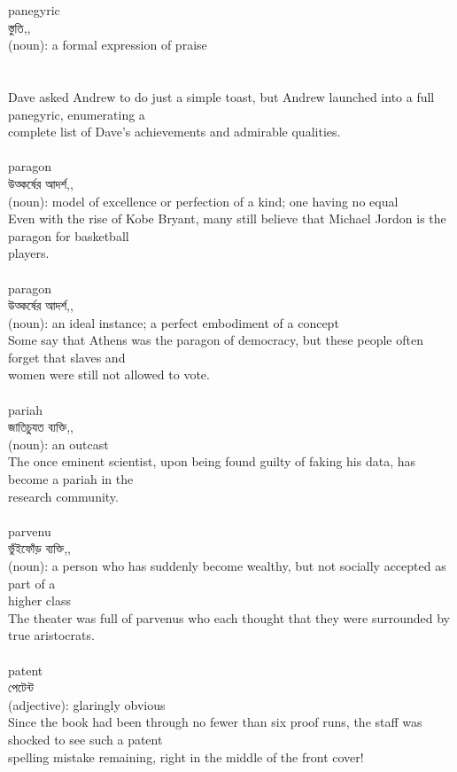 \documentclass{article}
\begin{document}
{{panegyric}\\
{স্তুতি,,}\\
{(noun): a formal expression of praise\\\\                                                                              \\Dave asked Andrew to do just a simple toast, but Andrew launched into a full panegyric, enumerating a\\complete list of Dave's achievements and admirable qualities.\\}\\
{paragon}\\
{উত্কর্ষের আদর্শ,,}\\
{(noun): model of excellence or perfection of a kind; one having no equal\\Even with the rise of Kobe Bryant, many still believe that Michael Jordon is the paragon for basketball\\players.\\}\\
{paragon}\\
{উত্কর্ষের আদর্শ,,}\\
{(noun): an ideal instance; a perfect embodiment of a concept\\Some say that Athens was the paragon of democracy, but these people often forget that slaves and\\women were still not allowed to vote.\\}\\
{pariah}\\
{জাতিচু্যত ব্যক্তি,,}\\
{(noun): an outcast\\The once eminent scientist, upon being found guilty of faking his data, has become a pariah in the\\research community.\\}\\
{parvenu}\\
{ভুঁইফোঁড় ব্যক্তি,,}\\
{(noun): a person who has suddenly become wealthy, but not socially accepted as part of a\\higher class\\The theater was full of parvenus who each thought that they were surrounded by true aristocrats.\\}\\
{patent}\\
{পেটেন্ট}\\
{(adjective): glaringly obvious\\Since the book had been through no fewer than six proof runs, the staff was shocked to see such a patent\\spelling mistake remaining, right in the middle of the front cover!\\}\\
}
\end{document}
